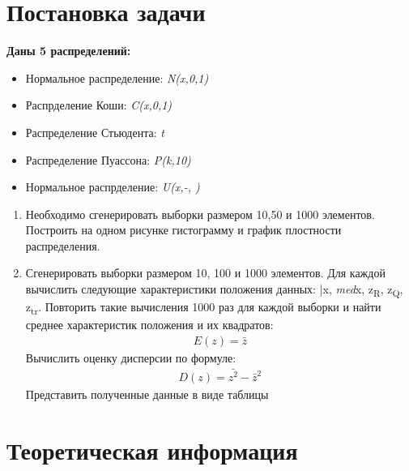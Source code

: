 \usepackage{amsmath}
\section{Постановка задачи}
\textbf{Даны 5 распределений:}
\begin{itemize}
\item Нормальное распределение: \textit{N(x,0,1)}
\item Распрделение Коши: \textit{C(x,0,1)}
\item Распределение Стьюдента:\textit{ t}
\item Распределение Пуассона: \textit{P(k,10)}
\item Нормальное распрделение: \textit{U(x,-, )}
\end{itemize}
\begin{enumerate}
    \item Необходимо сгенерировать выборки размером 10,50 и 1000 элементов. Построить на одном рисунке гистограмму и график плостности распределения.
    \item Сгенерировать выборки размером 10, 100 и 1000 элементов. Для каждой вычислить следующие характеристики положения данных: \bar{x}, \textit{med}x, z\textsubscript{R}, z\textsubscript{Q}, z\textsubscript{tr}. Повторить такие вычисления 1000 раз для каждой выборки и найти среднее характеристик положения и их квадратов:
    \begin{gather*}
 E(z) = \bar{z}
\end{gather*} 
    Вычислить оценку дисперсии по формуле:
    \begin{gather*}
    D(z) = \bar{z^{2}} - \bar{z}^{2}
\end{gather*} 
    Представить полученные данные в виде таблицы
\end{enumerate}


\section{Теоретическая информация}


